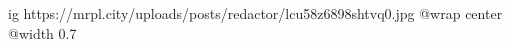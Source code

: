  
 
 
 
 

\ifcmt
  ig https://mrpl.city/uploads/posts/redactor/lcu58z6898shtvq0.jpg
  @wrap center
  @width 0.7
\fi

